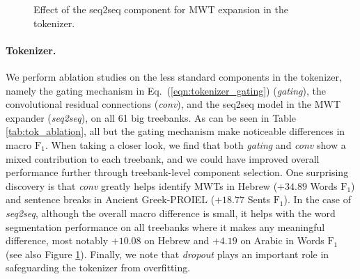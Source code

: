 \documentclass[11pt,a4paper]{article}
\newcommand{\fone}{$\text{F}_1$}
\begin{document}
\begin{figure}
    \centering
    \setlength{\abovecaptionskip}{-4pt}
         \caption{Effect of the seq2seq component for MWT expansion in the tokenizer.}\label{fig:tok_seq2seq}
\end{figure}

\paragraph{Tokenizer.}
We perform ablation studies on the less standard components in the tokenizer, namely the gating mechanism in Eq.~(\ref{eqn:tokenizer_gating}) (\textit{gating}), the convolutional residual connections (\textit{conv}), and the seq2seq model in the MWT expander (\textit{seq2seq}), on all 61 big treebanks. As can be seen in Table \ref{tab:tok_ablation}, all but the gating mechanism make noticeable differences in macro \fone{}. When taking a closer look, we find that both \textit{gating} and \textit{conv} show a mixed contribution to each treebank, and we could have improved overall performance further through treebank-level component selection.
One surprising discovery is that \textit{conv} greatly helps identify MWTs in Hebrew ($+34.89$ Words \fone{}) and sentence breaks in Ancient Greek-PROIEL ($+18.77$ Sents \fone{}).
In the case of \textit{seq2seq}, although the overall macro difference is small, it helps with the word segmentation performance on all treebanks where it makes any meaningful difference, most notably $+10.08$ on Hebrew and $+4.19$ on Arabic in Words \fone{} (see also Figure \ref{fig:tok_seq2seq}).
Finally, we note that \emph{dropout} plays an important role in safeguarding the tokenizer from overfitting.
\end{document}
